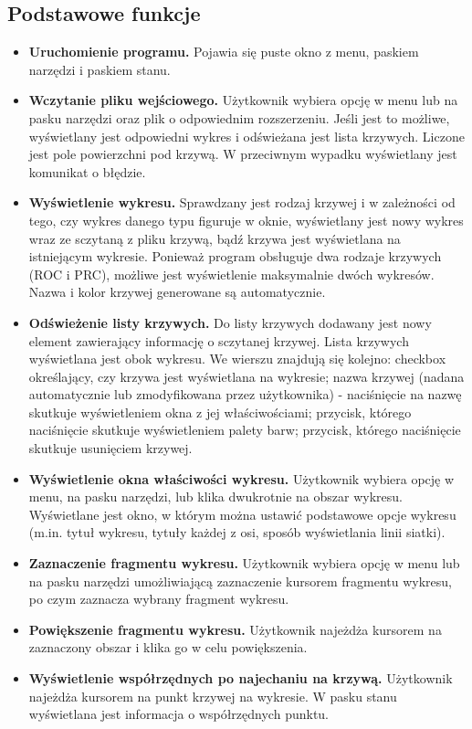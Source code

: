 \documentclass[12pt,a4paper,titlepage]{article}
\begin{document}
\subsection{Podstawowe funkcje}
\begin{itemize}
\item \textbf{Uruchomienie programu.} Pojawia się puste okno z menu, paskiem narzędzi i paskiem stanu.
\item \textbf{Wczytanie pliku wejściowego.} Użytkownik wybiera opcję w menu lub na pasku narzędzi oraz plik o odpowiednim rozszerzeniu. Jeśli jest to możliwe, wyświetlany jest odpowiedni wykres i odświeżana jest lista krzywych. Liczone jest pole powierzchni pod krzywą. W przeciwnym wypadku wyświetlany jest komunikat o błędzie.
\item \textbf{Wyświetlenie wykresu.} Sprawdzany jest rodzaj krzywej i w zależności od tego, czy wykres danego typu figuruje w oknie, wyświetlany jest nowy wykres wraz ze sczytaną z pliku krzywą, bądź krzywa jest wyświetlana na istniejącym wykresie. Ponieważ program obsługuje dwa rodzaje krzywych (ROC i PRC), możliwe jest wyświetlenie maksymalnie dwóch wykresów. Nazwa i kolor krzywej generowane są automatycznie.
\item \textbf{Odświeżenie listy krzywych.} Do listy krzywych dodawany jest nowy element zawierający informację o sczytanej krzywej. Lista krzywych wyświetlana jest obok wykresu. We wierszu znajdują się kolejno: checkbox określający, czy krzywa jest wyświetlana na wykresie; nazwa krzywej (nadana automatycznie lub zmodyfikowana przez użytkownika) - naciśnięcie na nazwę skutkuje wyświetleniem okna z jej właściwościami; przycisk, którego naciśnięcie skutkuje wyświetleniem palety barw; przycisk, którego naciśnięcie skutkuje usunięciem krzywej.
\item \textbf{Wyświetlenie okna właściwości wykresu.} Użytkownik wybiera opcję w menu, na pasku narzędzi, lub klika dwukrotnie na obszar wykresu. Wyświetlane jest okno, w którym można ustawić podstawowe opcje wykresu (m.in. tytuł wykresu, tytuły każdej z osi, sposób wyświetlania linii siatki).
\item \textbf{Zaznaczenie fragmentu wykresu.} Użytkownik wybiera opcję w menu lub na pasku narzędzi umożliwiającą zaznaczenie kursorem fragmentu wykresu, po czym zaznacza wybrany fragment wykresu.
\item \textbf{Powiększenie fragmentu wykresu.} Użytkownik najeżdża kursorem na zaznaczony obszar i klika go w celu powiększenia.
\item \textbf{Wyświetlenie współrzędnych po najechaniu na krzywą.} Użytkownik najeżdża kursorem na punkt krzywej na wykresie. W pasku stanu wyświetlana jest informacja o współrzędnych punktu.

\end{itemize}
\end{document}
